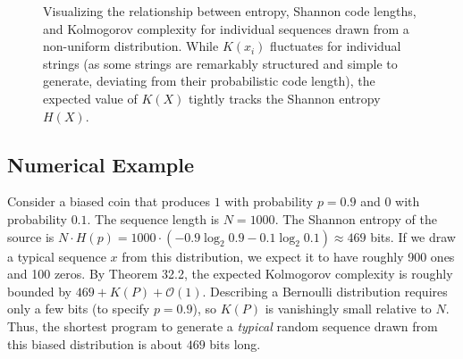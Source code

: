 \begin{figure}[htpb]
    \centering
    \caption{Visualizing the relationship between entropy, Shannon code lengths, and Kolmogorov complexity for individual sequences drawn from a non-uniform distribution. While $K(x_i)$ fluctuates for individual strings (as some strings are remarkably structured and simple to generate, deviating from their probabilistic code length), the expected value of $K(X)$ tightly tracks the Shannon entropy $H(X)$.}
    \label{fig:complexity_bounds}
\end{figure}

\subsection{Numerical Example}
Consider a biased coin that produces $1$ with probability $p=0.9$ and $0$ with probability $0.1$. The sequence length is $N = 1000$.
The Shannon entropy of the source is $N \cdot H(p) = 1000 \cdot (-0.9 \log_2 0.9 - 0.1 \log_2 0.1) \approx 469$ bits. 
If we draw a typical sequence $x$ from this distribution, we expect it to have roughly 900 ones and 100 zeros. By Theorem 32.2, the expected Kolmogorov complexity is roughly bounded by $469 + K(P) + \mathcal{O}(1)$. Describing a Bernoulli distribution requires only a few bits (to specify $p=0.9$), so $K(P)$ is vanishingly small relative to $N$. Thus, the shortest program to generate a \textit{typical} random sequence drawn from this biased distribution is about $469$ bits long. 


